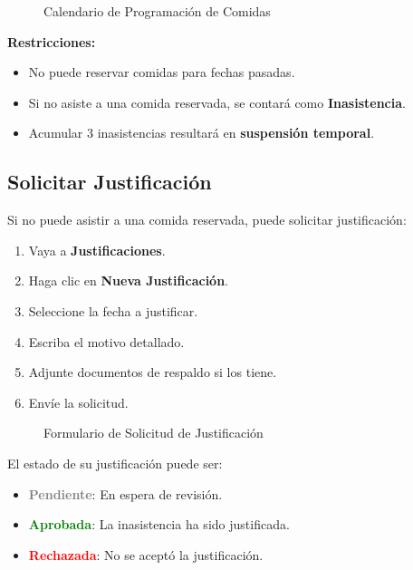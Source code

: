 \documentclass[12pt,a4paper]{article}
\begin{document}
\begin{figure}[h]
    \centering
    \caption{Calendario de Programación de Comidas}
    \label{fig:programar_comidas}
\end{figure}

\textbf{Restricciones:}
\begin{itemize}
    \item No puede reservar comidas para fechas pasadas.
    \item Si no asiste a una comida reservada, se contará como \textbf{Inasistencia}.
    \item Acumular 3 inasistencias resultará en \textbf{suspensión temporal}.
\end{itemize}

\subsection{Solicitar Justificación}
Si no puede asistir a una comida reservada, puede solicitar justificación:

\begin{enumerate}
    \item Vaya a \textbf{Justificaciones}.
    \item Haga clic en \textbf{Nueva Justificación}.
    \item Seleccione la fecha a justificar.
    \item Escriba el motivo detallado.
    \item Adjunte documentos de respaldo si los tiene.
    \item Envíe la solicitud.
\end{enumerate}

\begin{figure}[h]
    \centering
    \caption{Formulario de Solicitud de Justificación}
    \label{fig:justificacion}
\end{figure}

El estado de su justificación puede ser:
\begin{itemize}
    \item \textcolor{gray}{\textbf{Pendiente}}: En espera de revisión.
    \item \textcolor{green}{\textbf{Aprobada}}: La inasistencia ha sido justificada.
    \item \textcolor{red}{\textbf{Rechazada}}: No se aceptó la justificación.
\end{itemize}
\end{document}
